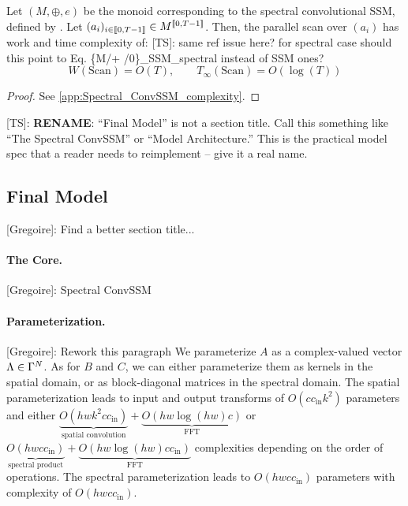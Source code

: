 \documentclass{article}
\newcommand{\greg}[1]{{\color{indigo}[Gregoire]: #1}}
\newcommand{\TS}[1]{{\color{pink}[TS]: #1}}
\begin{document}
\begin{proposition}
\label{prop:Spectral_ConvSSM_complexity}
    Let $(M, \oplus, e)$ be the monoid corresponding to the spectral convolutional SSM, defined by . Let $(a_i)_{i\in \llbracket 0, T-1 \rrbracket}\in M^{\llbracket 0, T-1 \rrbracket}$. Then, the parallel scan over $(a_i)$ has work and time complexity of:
\TS{same ref issue here? for spectral case should this point to Eq. \{M/+ /0\}\_SSM\_spectral instead of SSM ones?}
\[
    W(\mathrm{Scan}) = O(T), \qquad T_\infty(\mathrm{Scan}) = O(\log(T))
\]
\end{proposition}

\begin{proof}
See \cref{app:Spectral_ConvSSM_complexity}.
\end{proof}

\TS{\textbf{RENAME}: ``Final Model'' is not a section title. Call this something like ``The Spectral ConvSSM'' or ``Model Architecture.'' This is the practical model spec that a reader needs to reimplement -- give it a real name.}

\subsection{Final Model}
\greg{Find a better section title...}

\paragraph{The Core.} \greg{Spectral ConvSSM}

\paragraph{Parameterization.} \greg{Rework this paragraph} We parameterize $A$ as a complex-valued vector $\Lambda \in \Gamma^N$. As for $B$ and $C$, we can either parameterize them as kernels in the spatial domain, or as block-diagonal matrices in the spectral domain.
%
The spatial parameterization leads to input and output transforms of $O(c c_\mathrm{in} k^2)$ parameters and either $\underbrace{O(hwk^2cc_\mathrm{in})}_{\text{spatial convolution}} + \underbrace{O(hw \log(hw) c)}_{\text{FFT}}$ or $\underbrace{O(hwcc_\mathrm{in})}_{\text{spectral product}} + \underbrace{O(hw \log(hw) c c_\mathrm{in})}_{\text{FFT}}$ complexities depending on the order of operations.
%
The spectral parameterization leads to $O(hwcc_\mathrm{in})$ parameters with complexity of $O(hwcc_\mathrm{in})$.
\end{document}
